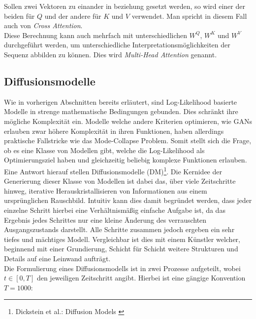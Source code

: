 Sollen zwei Vektoren zu einander in beziehung gesetzt werden, so wird einer der beiden für $Q$ und der andere für $K$ und $V$ verwendet. Man spricht in diesem Fall auch von \textit{Cross Attention}. \\
Diese Berechnung kann auch mehrfach mit unterschiedlichen $W^Q$, $W^K$ und $W^V$ durchgeführt werden, um unterschiedliche Interpretationsmöglichkeiten der Sequenz abbilden zu können. Dies wird \textit{Multi-Head Attention} genannt.

\subsection{Diffusionsmodelle}
\label{subsec:Grundlagen_DMs}

Wie in vorherigen Abschnitten bereits erläutert, sind Log-Likelihood basierte Modelle in strenge mathematische Bedingungen gebunden. Dies schränkt ihre mögliche Komplexität ein. Modelle welche andere Kriterien optimieren, wie GANs erlauben zwar höhere Komplexität in ihren Funktionen, haben allerdings praktische Fallstricke wie das Mode-Collapse Problem. Somit stellt sich die Frage, ob es eine Klasse von Modellen gibt, welche die Log-Likelihood als Optimierungsziel haben und gleichzeitig beliebig komplexe Funktionen erlauben. \\
Eine Antwort hierauf stellen Diffusionsmodelle (DM)\footnote{
    Dickstein et al.: Diffusion Models
    \cite{pmlr-v37-sohl-dickstein15}
}. Die Kernidee der Generierung dieser Klasse von Modellen ist dabei das, über viele Zeitschritte hinweg, iterative Herauskristallisieren von Informationen aus einem ursprünglichen Rauschbild. Intuitiv kann dies damit begründet werden, dass jeder einzelne Schritt hierbei eine Verhältnismäßig einfache Aufgabe ist, da das Ergebnis jedes Schrittes nur eine kleine Änderung des verrauschten Ausgangszustands darstellt. Alle Schritte zusammen jedoch ergeben ein sehr tiefes und mächtiges Modell. Vergleichbar ist dies mit einem Künstler welcher, beginnend mit einer Grundierung, Schicht für Schicht weitere Strukturen und Details auf eine Leinwand aufträgt. \\
Die Formulierung eines Diffusionsmodells ist in zwei Prozesse aufgeteilt, wobei $t \in [0,T]$ den jeweiligen Zeitschritt angibt. Hierbei ist eine gängige Konvention $T=1000$: 
